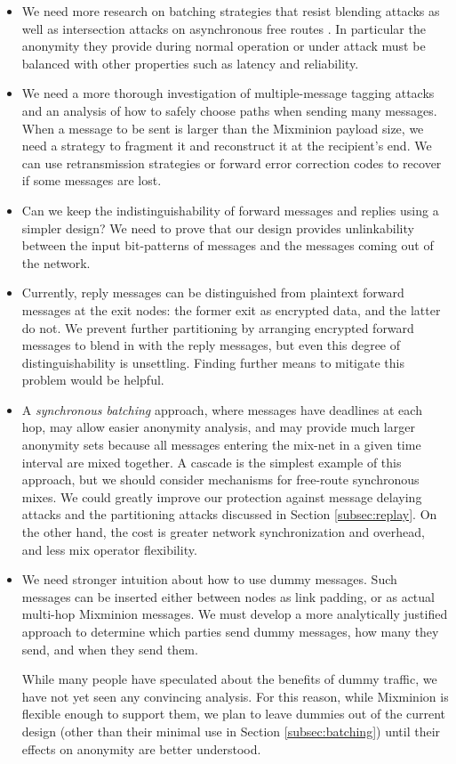 \documentclass[final,inpress,inline]{ieee}
\begin{document}
\begin{itemize}
\item We need more research on batching strategies that resist blending
attacks \cite{batching-taxonomy} as well as intersection
attacks on asynchronous free routes \cite{disad-free-routes}. In
particular the anonymity they provide during normal operation or
under attack must be balanced with other properties such as latency
and reliability.
\item We need a more thorough investigation of multiple-message tagging
attacks and an analysis of how to safely choose paths when
sending many messages. When a message to be sent is larger than the
Mixminion payload size, we need a strategy to fragment
it and reconstruct it at the recipient's end. 
We can use retransmission strategies or forward error
correction codes to recover if some messages are lost.
\item Can we keep the indistinguishability of forward messages and
replies using a simpler design? We need to prove that our design provides
unlinkability between the input bit-patterns of messages and the messages
coming out of the network.
\item Currently, reply messages can be distinguished from plaintext forward
messages at the exit nodes: the former exit as encrypted data, and the
latter do not.  We prevent further partitioning by arranging 
encrypted forward messages to blend in with the reply messages, but even this
degree of distinguishability is unsettling.  Finding further means to
mitigate this problem would be helpful.
\item A \emph{synchronous batching} approach, where messages have
deadlines at each hop, may allow easier anonymity analysis, and may
provide much larger anonymity sets because all messages entering the
mix-net in a given time interval are mixed together. A cascade is the
simplest example of this approach, but we should consider mechanisms for
free-route synchronous mixes. We could greatly improve our protection
against message delaying attacks and the partitioning attacks discussed
in Section \ref{subsec:replay}. On the other hand, the cost is greater
network synchronization and overhead, and less mix operator flexibility.
\item We need stronger intuition about how to use dummy messages. Such
messages can be inserted either between nodes as link padding, or as
actual multi-hop Mixminion messages. We must develop a more analytically
justified approach to determine which parties send dummy messages, how many
they send, and when they send them.

\quad While many people have speculated about the benefits of dummy traffic,
we have not yet seen any convincing analysis. For this reason, while
Mixminion is flexible enough to support them, we plan to leave dummies
out of the current design (other than their minimal use in Section
\ref{subsec:batching}) until their effects on anonymity are better
understood.
\end{itemize}
\end{document}
